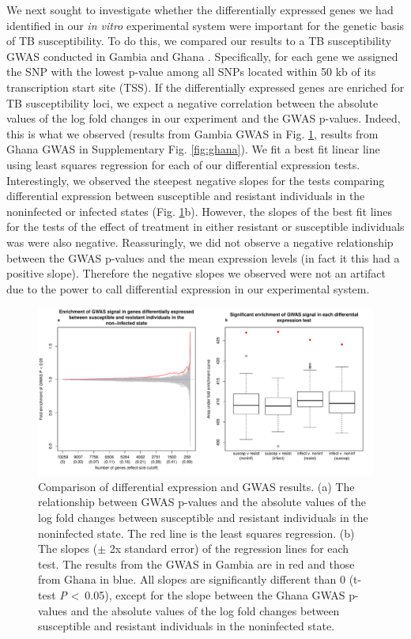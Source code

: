 \documentclass[fleqn,10pt]{wlscirep}
\begin{document}
We next sought to investigate whether the differentially expressed
genes we had identified in our \emph{in vitro} experimental system
were important for the genetic basis of TB susceptibility. To do this,
we compared our results to a TB susceptibility GWAS conducted in
Gambia and Ghana \cite{Thye2010}. Specifically, for each gene we
assigned the SNP with the lowest p-value among all SNPs located within
50 kb of its transcription start site (TSS). If the differentially
expressed genes are enriched for TB susceptibility loci, we expect a
negative correlation between the absolute values of the log fold
changes in our experiment and the GWAS p-values. Indeed, this is what
we observed (results from Gambia GWAS in Fig. \ref{fig:gwas}, results
from Ghana GWAS in Supplementary Fig. \ref{fig:ghana}). We fit a best
fit linear line using least squares regression for each of our
differential expression tests. Interestingly, we observed the steepest
negative slopes for the tests comparing differential expression
between susceptible and resistant individuals in the noninfected or
infected states (Fig. \ref{fig:gwas}b). However, the slopes of the
best fit lines for the tests of the effect of treatment in either
resistant or susceptible individuals was were also negative.
Reassuringly, we did not observe a negative relationship between the
GWAS p-values and the mean expression levels (in fact it this had a
positive slope). Therefore the negative slopes we observed were not an
artifact due to the power to call differential expression in our
experimental system.

\begin{figure}[ht]
\centering
\includegraphics[width=\linewidth]{../figure/gwas.pdf}
\caption{
Comparison of differential expression and GWAS results. (a) The
relationship between GWAS p-values \cite{Thye2010} and the absolute
values of the log fold changes between susceptible and resistant
individuals in the noninfected state. The red line is the least
squares regression. (b) The slopes ($\pm$ 2x standard error) of the
regression lines for each test. The results from the GWAS in Gambia
are in red and those from Ghana in blue. All slopes are significantly
different than 0 (t-test \emph{P} \textless \, 0.05), except for the
slope between the Ghana GWAS p-values and the absolute values of the
log fold changes between susceptible and resistant individuals in the
noninfected state.
}
\label{fig:gwas}
\end{figure}
\end{document}

